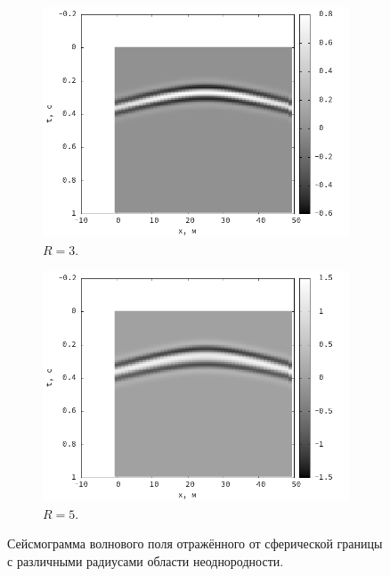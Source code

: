 \documentclass[a4paper, fontsize=14pt]{article}
\begin{document}
	
	\begin{figure}[H]
		\begin{subfigure}{.5\textwidth}
			\centering
			\includegraphics[width=\textwidth]{sphere_3_seism.png}
			\caption{$R=3$.}
			\label{fig:sphere3}
		\end{subfigure}
		\begin{subfigure}{.5\textwidth}
			\centering
			\includegraphics[width=\textwidth]{sphere_5_seism.png}
			\caption{$R=5$.}
			\label{fig:sphere5}
		\end{subfigure}
		\caption{Сейсмограмма волнового поля отражённого от сферической границы с различными радиусами области неоднородности.}
	\end{figure}
	
\end{document}
